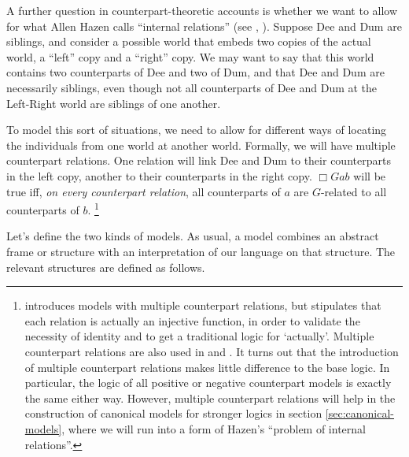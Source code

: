 \documentclass[11pt]{woarticle}
\theoremstyle{break}
\theoremstyle{nonumberplain}
\newcommand{\1}{\;\,|\;\,}
\begin{document}
A further question in counterpart-theoretic accounts is whether we want to allow
for what Allen Hazen calls ``internal relations'' (see
\cite[328--330]{hazen79counterpart}, \cite[232f.]{plurality}). Suppose Dee and
Dum are siblings, and consider a possible world that embeds two copies of the
actual world, a ``left'' copy and a ``right'' copy. We may want to say that this
world contains two counterparts of Dee and two of Dum, and that Dee and Dum are
necessarily siblings, even though not all counterparts of Dee and Dum at the
Left-Right world are siblings of one another.

To model this sort of situations, we need to allow for different ways of
locating the individuals from one world at another world. Formally, we will have
multiple counterpart relations. One relation will link Dee and Dum to their
counterparts in the left copy, another to their counterparts in the right copy.
$\Box Gab$ will be true iff, \emph{on every counterpart relation}, all
counterparts of $a$ are $G$-related to all counterparts of $b$.%
\footnote{\label{fn-multicr}%
  \cite{hazen79counterpart} introduces models with multiple counterpart
  relations, but stipulates that each relation is actually an injective
  function, in order to validate the necessity of identity and to get a
  traditional logic for `actually'. Multiple counterpart relations are also used
  in \cite{kutz00kripke} and \cite{kracht02semantics}. It turns out that the
  introduction of multiple counterpart relations makes little difference to the
  base logic. In particular, the logic of all positive or negative counterpart
  models is exactly the same either way. However, multiple counterpart relations
  will help in the construction of canonical models for stronger logics in
  section \ref{sec:canonical-models}, where we will run into a form of Hazen's ``problem of
  internal relations''.%
} %

Let's define the two kinds of models. As usual, a model combines an abstract
frame or structure with an interpretation of our language on that structure. The
relevant structures are defined as follows.
\end{document}
